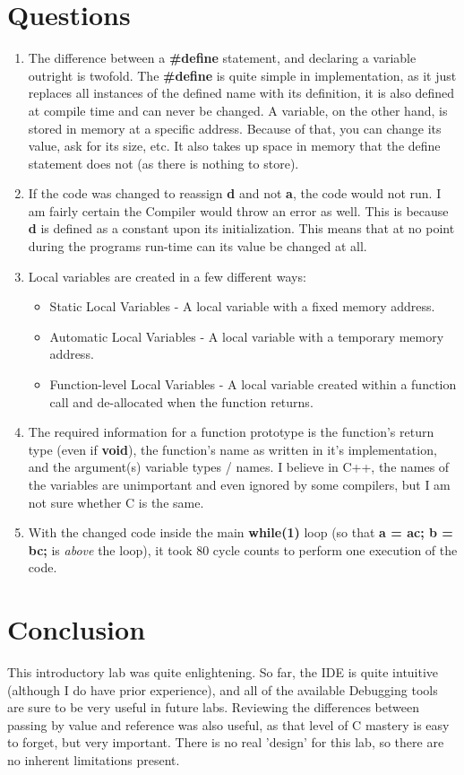\documentclass[a4paper, 12pt]{article}
\begin{document}
\section{Questions}
\begin{enumerate}
\item The difference between a \textbf{\#define} statement, and declaring a variable outright is twofold. The \textbf{\#define} is quite simple in implementation, as it just replaces all instances of the defined name with its definition, it is also defined at compile time and can never be changed. A variable, on the other hand, is stored in memory at a specific address. Because of that, you can change its value, ask for its size, etc. It also takes up space in memory that the define statement does not (as there is nothing to store).
\item If the code was changed to reassign \textbf{d} and not \textbf{a}, the code would not run. I am fairly certain the Compiler would throw an error as well. This is because \textbf{d} is defined as a constant upon its initialization. This means that at no point during the programs run-time can its value be changed at all.
\item Local variables are created in a few different ways:
\begin{itemize}
\item Static Local Variables - A local variable with a fixed memory address.
\item Automatic Local Variables - A local variable with a temporary memory address.
\item Function-level Local Variables - A local variable created within a function call and de-allocated when the function returns.
\end{itemize}
\item The required information for a function prototype is the function's return type (even if \textbf{void}), the function's name as written in it's implementation, and the argument(s) variable types / names. I believe in C++, the names of the variables are unimportant and even ignored by some compilers, but I am not sure whether C is the same.
\item With the changed code inside the main \textbf{while(1)} loop (so that \textbf{a = ac; b = bc;} is \textit{above} the loop), it took 80 cycle counts to perform one execution of the code.
\end{enumerate}

\section{Conclusion}
This introductory lab was quite enlightening. So far, the IDE is quite intuitive (although I do have prior experience), and all of the available Debugging tools are sure to be very useful in future labs. Reviewing the differences between passing by value and reference was also useful, as that level of C mastery is easy to forget, but very important. There is no real 'design' for this lab, so there are no inherent limitations present.
\end{document}
